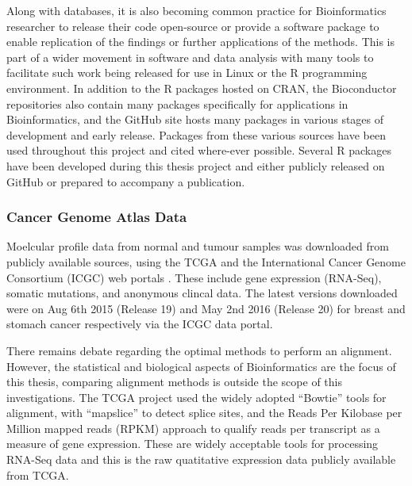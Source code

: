 Along with databases, it is also becoming common practice for Bioinformatics researcher to release their code open-source or provide a software package to enable replication of the findings or further applications of the methods. This is part of a wider movement in software and data analysis with many tools to facilitate such work being released for use in Linux or the R programming environment. In addition to the R packages hosted on CRAN, the Bioconductor repositories also contain many packages specifically for applications in Bioinformatics, and the GitHub site hosts many packages in various stages of development and early release. Packages from these various sources have been used throughout this project and cited where-ever possible. Several R packages have been developed during this thesis project and either publicly released on GitHub or prepared to accompany a publication.

\subsubsection{Cancer Genome Atlas Data}
Moelcular profile data from normal and tumour samples was downloaded from publicly available sources, using the TCGA \cite{TCGA2012} and the International Cancer Genome Consortium (ICGC) web portals \cite{ICGC2011}. These include gene expression (RNA-Seq), somatic mutations, and anonymous clincal data. The latest versions downloaded were on Aug 6th 2015 (Release 19) and May 2nd 2016 (Release 20) for breast and stomach cancer respectively via the ICGC data portal.

There remains debate regarding the optimal methods to perform an alignment. However, the statistical and biological aspects of Bioinformatics are the focus of this thesis, comparing alignment methods is outside the scope of this investigations. The TCGA project used the widely adopted ``Bowtie'' tools for alignment, with ``mapslice'' to detect splice sites, and the Reads Per Kilobase per Million mapped reads (RPKM) approach to qualify reads per transcript as a measure of gene expression. These are widely acceptable tools for processing RNA-Seq data and this is the raw quatitative expression data publicly available from TCGA.

